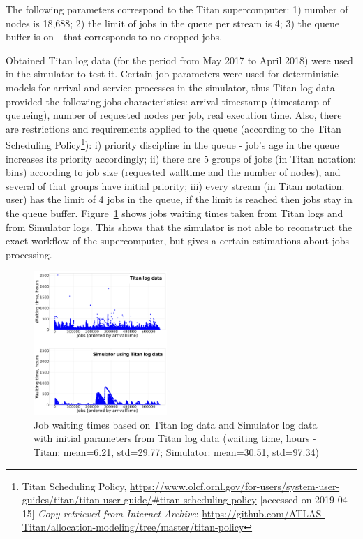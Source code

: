 The following parameters correspond to the Titan supercomputer: 
1) number of nodes is 18,688; 
2) the limit of jobs in the queue per stream is 4; 
3) the queue buffer is on - that corresponds to no dropped jobs.

Obtained Titan log data (for the period from May 2017 to April 2018) were used in the simulator to test it. Certain job parameters were used for deterministic models for arrival and service processes in the simulator, thus Titan log data provided the following jobs characteristics: arrival timestamp (timestamp of queueing), number of requested nodes per job, real execution time. Also, there are restrictions and requirements applied to the queue (according to the Titan Scheduling Policy\footnote{Titan Scheduling Policy, \url{https://www.olcf.ornl.gov/for-users/system-user-guides/titan/titan-user-guide/#titan-scheduling-policy} [accessed on 2019-04-15] \textit{Copy retrieved from Internet Archive}: \url{https://github.com/ATLAS-Titan/allocation-modeling/tree/master/titan-policy}}): i) priority discipline in the queue - job's age in the queue increases its priority accordingly; ii) there are 5 groups of jobs (in Titan notation: bins) according to job size (requested walltime and the number of nodes), and several of that groups have initial priority; iii) every stream (in Titan notation: user) has the limit of 4 jobs in the queue, if the limit is reached then jobs stay in the queue buffer. Figure~\ref{fig-simulator-testing} shows jobs waiting times taken from Titan logs and from Simulator logs. This shows that the simulator is not able to reconstruct the exact workflow of the supercomputer, but gives a certain estimations about jobs processing.

\begin{figure}
    \centering
    \includegraphics[width=0.45\textwidth]{pics/simulator-testing.png}
    \caption{Job waiting times based on Titan log data and Simulator log data with initial parameters from Titan log data (waiting time, hours - Titan: mean=6.21, std=29.77; Simulator: mean=30.51, std=97.34)}
    \label{fig-simulator-testing} 
\end{figure}

